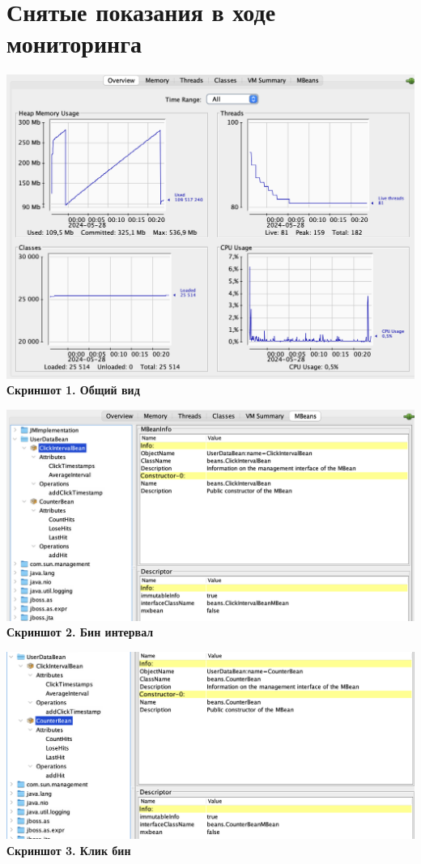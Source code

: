 \documentclass{article}
\begin{document}
\section{Снятые показания в ходе мониторинга}
\begin{center}
    \includegraphics[width=.8\textwidth]{overview.png}\\
    \textbf{Скриншот 1. Общий вид}
\end{center}

\begin{center}
    \includegraphics[width=.8\textwidth]{interval.png}\\
    \textbf{Скриншот 2. Бин интервал}
\end{center}

\begin{center}
    \includegraphics[width=.8\textwidth]{click.png}\\
    \textbf{Скриншот 3. Клик бин}
\end{center}
\end{document}
